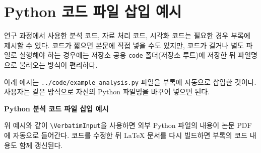 \section*{Python 코드 파일 삽입 예시}
\label{app:code-file-example}

%
%
%

연구 과정에서 사용한 분석 코드, 자료 처리 코드, 시각화 코드는 필요한 경우 부록에 제시할 수 있다.
코드가 짧으면 본문에 직접 넣을 수도 있지만, 코드가 길거나 별도 파일로 실행해야 하는 경우에는
저장소 공용 \verb|code| 폴더(저장소 루트)에 저장한 뒤 파일명으로 불러오는 방식이 편리하다.

아래 예시는 \verb|../code/example_analysis.py| 파일을 부록에 자동으로 삽입한 것이다.
사용자는 같은 방식으로 자신의 Python 파일명을 바꾸어 넣으면 된다.

\begin{center}
\textbf{Python 분석 코드 파일 삽입 예시}
\end{center}

\begingroup
\scriptsize
{}
\endgroup

위 예시와 같이 \verb|\VerbatimInput|을 사용하면 외부 Python 파일의 내용이 논문 PDF에 자동으로 들어간다.
코드를 수정한 뒤 LaTeX 문서를 다시 빌드하면 부록의 코드 내용도 함께 갱신된다.
